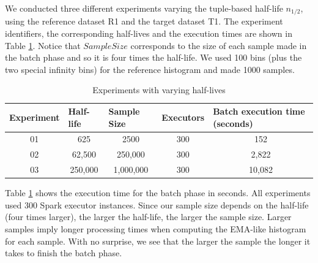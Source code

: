 We conducted three different experiments varying the tuple-based half-life $n_{1/2}$, using the reference dataset R1 and the target dataset T1. The experiment identifiers, the corresponding half-lives and the execution times are shown in Table \ref{tbl:tests-half-life}. Notice that $Sample Size$ corresponds to the size of each sample made in the batch phase and so it is four times the half-life. We used 100 bins (plus the two special infinity bins) for the reference histogram and made 1000 samples.
\begin{table}[!htb]
    \begin{center}
        \begin{tabular}{|c|c|c|c|c|}
        \hline
        \multicolumn{1}{|l|}{\textbf{Experiment}} & \multicolumn{1}{l|}{\textbf{Half-life}} & \multicolumn{1}{l|}{\textbf{Sample Size}} & \multicolumn{1}{l|}{\textbf{Executors}} & \multicolumn{1}{l|}{\textbf{Batch execution time (seconds)}} \\ \hline
        01                                        & 625                                     & 2500                                      & 300                                     & 152                                                          \\ \hline
        02                                        & 62,500                                  & 250,000                                   & 300                                     & 2,822                                                        \\ \hline
        03                                        & 250,000                                 & 1,000,000                                 & 300                                     & 10,082                                                       \\ \hline
        \end{tabular}
    \end{center}
    \caption{Experiments with varying half-lives}
    \label{tbl:tests-half-life}
\end{table}
Table \ref{tbl:tests-half-life} shows the execution time for the batch phase in seconds. All experiments used 300 Spark executor instances. Since our sample size depends on the half-life (four times larger), the larger the half-life, the larger the sample size. Larger samples imply longer processing times when computing the EMA-like histogram for each sample. With no surprise, we see that the larger the sample the longer it takes to finish the batch phase.

